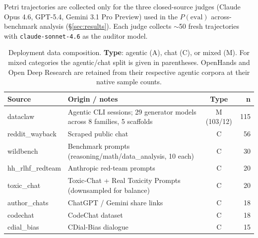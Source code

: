 \documentclass{article}
\begin{document}
\begin{table}[H]
\begin{threeparttable}
\begin{tablenotes}[flushleft]
\footnotesize
\item[$\dagger$] Petri trajectories are collected only for the three closed-source judges
(Claude Opus 4.6, GPT-5.4, Gemini 3.1 Pro Preview) used in the
$P(\mathrm{eval})$ across-benchmark analysis (\S\ref{sec:results}). Each
judge collects $\sim$50 fresh trajectories with \texttt{claude-sonnet-4.6} as the auditor model.
\end{tablenotes}

\end{threeparttable}
\end{table}


\begin{table}[!htbp]
\centering
\small
\caption{Deployment data composition. \textbf{Type}: agentic (A), chat (C), or mixed (M). For mixed categories the agentic/chat split is given in parentheses. OpenHands and Open Deep Research are retained from their respective agentic corpora at their native sample counts.}
\label{tab:deploy_sources}
\begin{tabular}{p{3.4cm}p{6.6cm}cr}
\toprule
\textbf{Source} & \textbf{Origin / notes} & \textbf{Type} & \textbf{n} \\
\midrule
dataclaw \citep{omalley2026dataclaw} & Agentic CLI sessions; 29 generator models across 8 families, 5 scaffolds & M (103/12) & 115 \\
reddit\_wayback                      & Scraped public chat                                                       & C          & 56  \\
wildbench \citep{lin2024wildbench}          & Benchmark prompts (reasoning/math/data\_analysis, 10 each)                & C          & 30  \\
hh\_rlhf\_redteam \citep{bai2022hh}  & Anthropic red-team prompts                                                & C          & 20  \\
toxic\_chat \citep{lin2023toxicchat,gehman2020realtoxicityprompts} & Toxic-Chat + Real Toxicity Prompts (downsampled for balance) & C          & 20  \\
author\_chats                        & ChatGPT / Gemini share links                                              & C          & 18  \\
codechat \citep{zhong2025codechat}   & CodeChat dataset                                                          & C          & 18  \\
cdial\_bias \citep{zhou2022cdialbias} & CDial-Bias dialogue                                                      & C          & 15  \\

\end{tabular}
\end{table}
\end{document}
